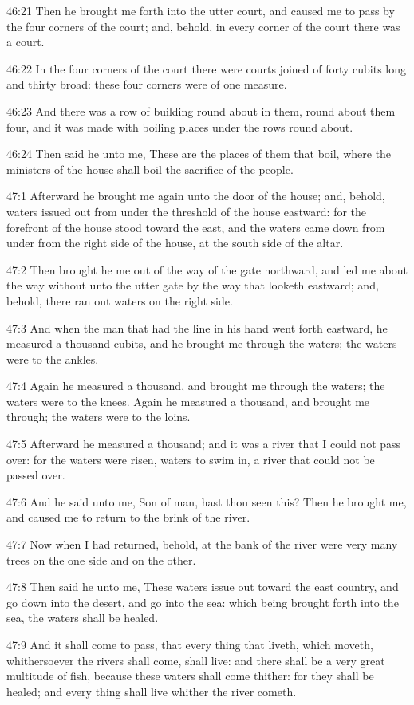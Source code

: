46:21 Then he brought me forth into the utter court, and caused me to pass by the four corners of the court; and, behold, in every corner of the court there was a court.

46:22 In the four corners of the court there were courts joined of forty cubits long and thirty broad: these four corners were of one measure.

46:23 And there was a row of building round about in them, round about them four, and it was made with boiling places under the rows round about.

46:24 Then said he unto me, These are the places of them that boil, where the ministers of the house shall boil the sacrifice of the people.

47:1 Afterward he brought me again unto the door of the house; and, behold, waters issued out from under the threshold of the house eastward: for the forefront of the house stood toward the east, and the waters came down from under from the right side of the house, at the south side of the altar.

47:2 Then brought he me out of the way of the gate northward, and led me about the way without unto the utter gate by the way that looketh eastward; and, behold, there ran out waters on the right side.

47:3 And when the man that had the line in his hand went forth eastward, he measured a thousand cubits, and he brought me through the waters; the waters were to the ankles.

47:4 Again he measured a thousand, and brought me through the waters; the waters were to the knees. Again he measured a thousand, and brought me through; the waters were to the loins.

47:5 Afterward he measured a thousand; and it was a river that I could not pass over: for the waters were risen, waters to swim in, a river that could not be passed over.

47:6 And he said unto me, Son of man, hast thou seen this? Then he brought me, and caused me to return to the brink of the river.

47:7 Now when I had returned, behold, at the bank of the river were very many trees on the one side and on the other.

47:8 Then said he unto me, These waters issue out toward the east country, and go down into the desert, and go into the sea: which being brought forth into the sea, the waters shall be healed.

47:9 And it shall come to pass, that every thing that liveth, which moveth, whithersoever the rivers shall come, shall live: and there shall be a very great multitude of fish, because these waters shall come thither: for they shall be healed; and every thing shall live whither the river cometh.

